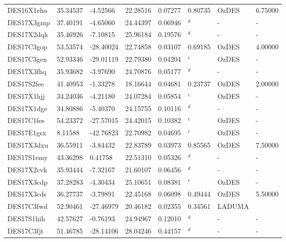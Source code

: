 \documentclass[fleqn,usenatbib,]{mnras}
\begin{document}
\begin{table}
\begin{threeparttable}
\begin{tabular}{llllllll}
DES16X1eho     & 35.34537 &  -4.52566 & 22.28516 & 0.07277 & 0.80735 &      OzDES &       6.75000 \\
DES17X3gmp     & 37.40191 &  -4.65060 & 24.44397 & 0.06946 &    $^d$ &          - &             - \\
DES17X2dqk     & 35.46926 &  -7.10815 & 25.96184 & 0.19576 &    $^d$ &          - &             - \\
DES17C3gop     & 53.53574 & -28.40024 & 22.74858 & 0.03107 & 0.69185 &      OzDES &       4.00000 \\
DES17C3gen     & 52.93346 & -29.01119 & 22.79380 & 0.04204 &    $^c$ &      OzDES &             - \\
DES17X3fhq     & 35.93682 &  -3.97690 & 24.70876 & 0.05177 &    $^d$ &          - &             - \\
DES17S2fee     & 41.40953 &  -1.33278 & 18.16644 & 0.04681 & 0.23737 &      OzDES &       2.00000 \\
DES17X1hjj     & 34.24036 &  -4.21180 & 24.07284 & 0.05854 &    $^c$ &      OzDES &             - \\
DES17X1dge     & 34.80886 &  -5.40370 & 24.15755 & 0.10116 &    $^d$ &          - &             - \\
DES17C1fes     & 54.23372 & -27.57015 & 24.42015 & 0.10382 &    $^c$ &      OzDES &             - \\
DES17E1gsx     &  8.11588 & -42.76823 & 22.70982 & 0.04695 &    $^c$ &      OzDES &             - \\
DES17X3dxu     & 36.55911 &  -3.84432 & 22.83789 & 0.03973 & 0.85565 &      OzDES &       7.50000 \\
DES17S1emy     & 43.36298 &   0.41758 & 22.51310 & 0.05326 &    $^d$ &          - &             - \\
DES17X2cvk     & 35.93444 &  -7.32167 & 21.60107 & 0.06456 &    $^d$ &          - &             - \\
DES17X3cdp     & 37.28283 &  -4.30434 & 25.10651 & 0.08381 &    $^c$ &      OzDES &             - \\
DES17X3cds     & 36.27737 &  -3.79891 & 22.45168 & 0.06098 & 0.49444 &      OzDES &       5.50000 \\
DES17C3fwd     & 52.90461 & -27.46979 & 20.46182 & 0.02355 & 0.34561 &    LADUMA &               \\
DES17S1hih     & 42.57627 &  -0.76193 & 24.94967 & 0.12010 &    $^d$ &          - &             - \\
DES17C3fjt     & 51.46785 & -28.14106 & 28.04246 & 0.44157 &    $^d$ &          - &             - \\

\end{tabular}
\end{threeparttable}
\end{table}
\end{document}
